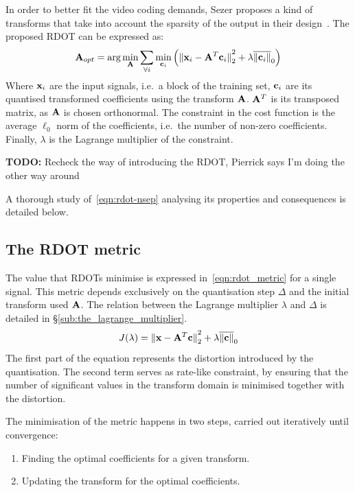 \documentclass[11pt,a4paper,openright,twoside]{book}
\providecommand{\todo}[1]{
	\begin{center}
		\colorbox{almostwhite}{
			\begin{minipage}{0.85\linewidth}
				\textbf{TODO:} #1
			\end{minipage}
		}
	\end{center}
}
\numberwithin{equation}{section} %
\numberwithin{figure}{section} %
\numberwithin{table}{section} %
\begin{document}
In order to better fit the video coding demands, Sezer proposes a kind of
transforms that take into account the sparsity of the output in their
design~\cite{sezer-11-phd}.
The proposed \ac{RDOT} can be expressed as:
\begin{equation}
	\mathbf{A}_{opt} = \text{arg}\min\limits_{\mathbf{A}}
	\sum_{\forall i} \min\limits_{\mathbf{c}_i}
	\left(
	{\Vert \mathbf{x}_i - \mathbf{A}^T\mathbf{c}_i \Vert}_2^2 + \lambda\overline{\Vert \mathbf{c}_i \Vert}_0
	\right)
	\label{eqn:rdot-nsep}
\end{equation}
Where $\mathbf{x}_i$ are the input signals, i.e.\ a block of the training set,
$\mathbf{c}_i$ are its quantised transformed coefficients using the transform
$\mathbf{A}$.
$\mathbf{A}^T$ is its transposed matrix, as $\mathbf{A}$ is chosen orthonormal.
The constraint in the cost function is the average $\ell_0$ norm of the
coefficients, i.e.\ the number of non-zero coefficients.
Finally, $\lambda$ is the Lagrange multiplier of the constraint.

\todo{Recheck the way of introducing the RDOT, Pierrick says I'm doing the
other way around}

A thorough study of~\eqref{eqn:rdot-nsep} analysing its properties and
consequences is detailed below.

\subsection{The \acs{RDOT} metric}
\label{sub:the_rdot_metric}

The value that \acp{RDOT} minimise is expressed
in~\eqref{eqn:rdot_metric} for a single signal.
This metric depends exclusively on the quantisation step $\Delta$ and the
initial transform used $\mathbf{A}$.
The relation between the Lagrange multiplier $\lambda$ and $\Delta$ is
detailed in \S\ref{sub:the_lagrange_multiplier}.
\begin{equation}
	J (\lambda) =
	{\Vert \mathbf{x} - \mathbf{A}^T \mathbf{c} \Vert}_2^2 + \lambda\overline{\Vert \mathbf{c} \Vert}_0
	\label{eqn:rdot_metric}
\end{equation}
The first part of the equation represents the distortion introduced by
the quantisation.
The second term serves as rate-like constraint, by ensuring that the
number of significant values in the transform domain is minimised together
with the distortion.

The minimisation of the metric happens in two steps, carried out iteratively
until convergence:
\begin{enumerate}
	\item Finding the optimal coefficients for a given transform.
	\item Updating the transform for the optimal coefficients.
\end{enumerate}
\end{document}
